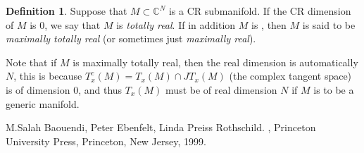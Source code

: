 \documentclass[12pt]{article}
\theoremstyle{theorem}
\theoremstyle{definition}
\newtheorem*{defn}{Definition}
\theoremstyle{remark}
\begin{document}
\begin{defn}
Suppose that $M \subset {\mathbb{C}}^N$ is a CR submanifold.  If the CR dimension of $M$ is 0, we say that $M$ is {\em totally real}.  If in addition
$M$ is , then $M$ is said to be {\em maximally totally real} (or sometimes just {\em maximally real}).
\end{defn}

Note that if $M$ is maximally totally real, then the real dimension is automatically $N$, this is because $T_x^c(M) = T_x(M) \cap JT_x(M)$
(the complex tangent space) is of dimension 0, and thus $T_x(M)$ must be of real dimension $N$ if $M$ is to be a generic manifold.

\begin{thebibliography}{9}
M.\@ Salah Baouendi,
Peter Ebenfelt,
Linda Preiss Rothschild.
{\em {}},
Princeton University Press,
Princeton, New Jersey, 1999.
\end{thebibliography}
\end{document}
